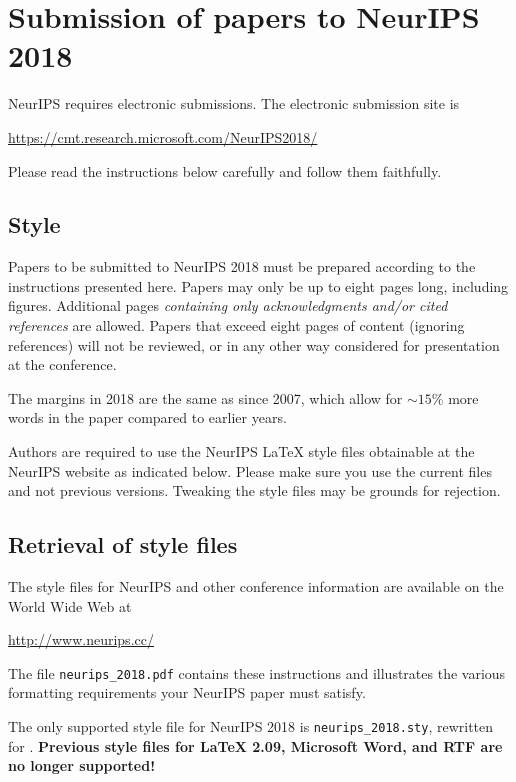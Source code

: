 \documentclass{article}
\begin{document}
\section{Submission of papers to NeurIPS 2018}

NeurIPS requires electronic submissions.  The electronic submission site is
\begin{center}
  \url{https://cmt.research.microsoft.com/NeurIPS2018/}
\end{center}

Please read the instructions below carefully and follow them faithfully.

\subsection{Style}

Papers to be submitted to NeurIPS 2018 must be prepared according to the
instructions presented here. Papers may only be up to eight pages long,
including figures. Additional pages \emph{containing only acknowledgments and/or
  cited references} are allowed. Papers that exceed eight pages of content
(ignoring references) will not be reviewed, or in any other way considered for
presentation at the conference.

The margins in 2018 are the same as since 2007, which allow for $\sim$$15\%$
more words in the paper compared to earlier years.

Authors are required to use the NeurIPS \LaTeX{} style files obtainable at the
NeurIPS website as indicated below. Please make sure you use the current files
and not previous versions. Tweaking the style files may be grounds for
rejection.

\subsection{Retrieval of style files}

The style files for NeurIPS and other conference information are available on
the World Wide Web at
\begin{center}
  \url{http://www.neurips.cc/}
\end{center}
The file \verb+neurips_2018.pdf+ contains these instructions and illustrates the
various formatting requirements your NeurIPS paper must satisfy.

The only supported style file for NeurIPS 2018 is \verb+neurips_2018.sty+,
rewritten for \LaTeXe{}.  \textbf{Previous style files for \LaTeX{} 2.09,
  Microsoft Word, and RTF are no longer supported!}
\end{document}
